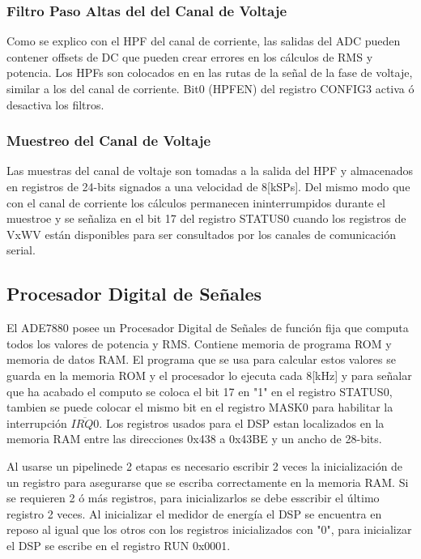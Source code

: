 \documentclass[letterpaper,12pt,oneside]{book}
\begin{document}
				\subsubsection{Filtro Paso Altas del del Canal de Voltaje}
				Como se explico con el HPF del canal de corriente, las salidas del ADC pueden contener offsets de DC que pueden crear errores en los cálculos de RMS y potencia. Los HPFs son colocados en en las rutas de la señal de la fase de voltaje, similar a los del canal de corriente. Bit0 (HPFEN) del registro CONFIG3 activa ó desactiva los filtros.

				\subsubsection{Muestreo del Canal de Voltaje}
				Las muestras del canal de voltaje son tomadas a la salida del HPF y almacenados en registros de 24-bits signados a una velocidad de 8[kSPs]. Del mismo modo que con el canal de corriente los cálculos permanecen ininterrumpidos durante el muestroe y se señaliza en el bit 17 del registro STATUS0 cuando los registros de VxWV están disponibles para ser consultados por los canales de comunicación serial.

			\subsection{Procesador Digital de Señales}
			El ADE7880 posee un Procesador Digital de Señales de función fija que computa todos los valores de potencia y RMS. Contiene memoria de programa ROM  y memoria de datos RAM. El programa que se usa para calcular estos valores se guarda en la memoria ROM y el procesador lo ejecuta cada 8[kHz] y para señalar que ha acabado el computo se coloca el bit 17 en "1" en el registro STATUS0, tambien se puede colocar el mismo bit en el registro MASK0 para habilitar la interrupción $\overline{IRQ0}$. Los registros usados para el DSP estan localizados en la memoria RAM entre las direcciones 0x438 a 0x43BE y un ancho de 28-bits.

			Al usarse un pipelinede 2 etapas es necesario escribir 2 veces la inicialización de un registro para asegurarse que se escriba correctamente en la memoria RAM. Si se requieren 2 ó más registros, para inicializarlos se debe esscribir el último registro 2 veces. Al inicializar el medidor de energía el DSP se encuentra en reposo al igual que los otros con los registros inicializados con "0", para inicializar el DSP se escribe en el registro RUN 0x0001.
\end{document}
